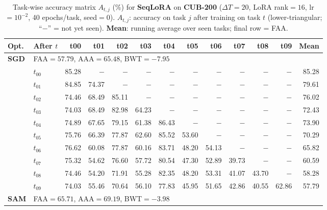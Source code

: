 
\begin{table}[ht]
\centering
\caption{%
  Task-wise accuracy matrix $A_{t,j}$ (\%) for \textbf{SeqLoRA} on \textbf{CUB-200} ($\Delta T=20$, LoRA rank$=16$, lr$=10^{-2}$, 40 epochs/task, seed$=0$).
  $A_{t,j}$: accuracy on task $j$ after training on task $t$  (lower-triangular; ``$-$'' = not yet seen).
  \textbf{Mean}: running average over seen tasks; final row = FAA.
}
\label{tab:raw_seqlora_cub200}
\setlength{\tabcolsep}{2.8pt}
\renewcommand{\arraystretch}{0.88}
\scriptsize
\begin{tabular}{@{}l l r r r r r r r r r r r@{}}
\toprule
\textbf{Opt.} & \textbf{After $t$} & \textbf{t00} & \textbf{t01} & \textbf{t02} & \textbf{t03} & \textbf{t04} & \textbf{t05} & \textbf{t06} & \textbf{t07} & \textbf{t08} & \textbf{t09} & \textbf{Mean} \\
\midrule
\multirow{11}{*}{\textbf{SGD}} & \multicolumn{12}{l}{\quad\small FAA$=57.79$,\; AAA$=65.48$,\; BWT$=-7.95$} \\
 & $t_{00}$ & 85.28 & $-$ & $-$ & $-$ & $-$ & $-$ & $-$ & $-$ & $-$ & $-$ & 85.28 \\
 & $t_{01}$ & 84.85 & 74.37 & $-$ & $-$ & $-$ & $-$ & $-$ & $-$ & $-$ & $-$ & 79.61 \\
 & $t_{02}$ & 74.46 & 68.49 & 85.11 & $-$ & $-$ & $-$ & $-$ & $-$ & $-$ & $-$ & 76.02 \\
 & $t_{03}$ & 74.03 & 68.49 & 82.98 & 64.23 & $-$ & $-$ & $-$ & $-$ & $-$ & $-$ & 72.43 \\
 & $t_{04}$ & 74.89 & 67.65 & 79.15 & 61.38 & 86.43 & $-$ & $-$ & $-$ & $-$ & $-$ & 73.90 \\
 & $t_{05}$ & 75.76 & 66.39 & 77.87 & 62.60 & 85.52 & 53.60 & $-$ & $-$ & $-$ & $-$ & 70.29 \\
 & $t_{06}$ & 76.62 & 60.08 & 77.87 & 60.16 & 83.71 & 48.20 & 54.13 & $-$ & $-$ & $-$ & 65.82 \\
 & $t_{07}$ & 75.32 & 54.62 & 76.60 & 57.72 & 80.54 & 47.30 & 52.89 & 39.73 & $-$ & $-$ & 60.59 \\
 & $t_{08}$ & 74.46 & 54.20 & 71.91 & 55.28 & 82.35 & 48.20 & 53.31 & 41.07 & 43.70 & $-$ & 58.28 \\
 & $t_{09}$ & 74.03 & 55.46 & 70.64 & 56.10 & 77.83 & 45.95 & 51.65 & 42.86 & 40.55 & 62.86 & 57.79 \\
\midrule
\multirow{11}{*}{\textbf{SAM}} & \multicolumn{12}{l}{\quad\small FAA$=65.71$,\; AAA$=69.19$,\; BWT$=-3.98$} \\

\end{tabular}
\end{table}
